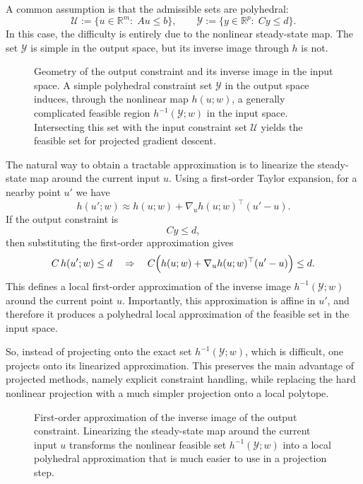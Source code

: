 A common assumption is that the admissible sets are polyhedral:
\[
\mathcal U:=\{u\in\mathbb R^m:\; Au\leq b\},
\qquad
\mathcal Y:=\{y\in\mathbb R^p:\; Cy\leq d\}.
\]
In this case, the difficulty is entirely due to the nonlinear steady-state map. The set $\mathcal Y$ is simple in the output space, but its inverse image through $h$ is not.

\begin{figure}[!h]
    \centering
    
    \caption{Geometry of the output constraint and its inverse image in the input space. A simple polyhedral constraint set $\mathcal Y$ in the output space induces, through the nonlinear map $h(u;w)$, a generally complicated feasible region $h^{-1}(\mathcal Y;w)$ in the input space. Intersecting this set with the input constraint set $\mathcal U$ yields the feasible set for projected gradient descent.}
    \label{fig:inverse-image-geometry}
\end{figure}

The natural way to obtain a tractable approximation is to linearize the steady-state map around the current input $u$. Using a first-order Taylor expansion, for a nearby point $u'$ we have
\[
h(u';w)\approx h(u;w)+\nabla_u h(u;w)^\top (u'-u).
\]
If the output constraint is
\[
Cy\leq d,
\]
then substituting the first-order approximation gives
\[
C\,h(u';w)\leq d
\quad\Rightarrow\quad
C\Bigl(h(u;w)+\nabla_u h(u;w)^\top (u'-u)\Bigr)\leq d.
\]
This defines a local first-order approximation of the inverse image $h^{-1}(\mathcal Y;w)$ around the current point $u$. Importantly, this approximation is affine in $u'$, and therefore it produces a polyhedral local approximation of the feasible set in the input space.

So, instead of projecting onto the exact set $h^{-1}(\mathcal Y;w)$, which is difficult, one projects onto its linearized approximation. This preserves the main advantage of projected methods, namely explicit constraint handling, while replacing the hard nonlinear projection with a much simpler projection onto a local polytope.

\begin{figure}[!h]
    \centering
    
    \caption{First-order approximation of the inverse image of the output constraint. Linearizing the steady-state map around the current input $u$ transforms the nonlinear feasible set $h^{-1}(\mathcal Y;w)$ into a local polyhedral approximation that is much easier to use in a projection step.}
    \label{fig:inverse-image-linearization}
\end{figure}

